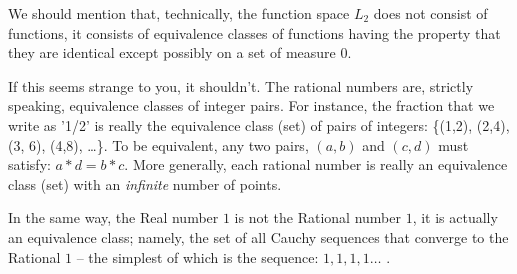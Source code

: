 \documentclass{article}
\begin{document}
We should mention that, technically, the function space $L_2$ does not 
consist of functions, it consists of 
equivalence classes of functions having the property
that they are identical except possibly on a set of measure $0$.

If this seems strange to you, it shouldn't. The rational numbers are, strictly 
speaking, equivalence classes of integer pairs.
For instance, the fraction that we write as '1/2' is really the 
equivalence class (set) of pairs of integers: 
\{(1,2), (2,4), (3, 6), (4,8), \ldots \}.
To be equivalent, any two pairs, $(a, b)$ and $(c, d)$ must satisfy: 
$a * d = b * c$. More generally, each rational number is really an equivalence class (set)
with an {\em infinite\/} number of points.

In the same way, the Real number $1$ is not the Rational number $1$, it is actually an equivalence 
class; namely, the set of all Cauchy sequences that converge to the Rational 
$1$ -- the simplest of which is the sequence: $1, 1, 1, 1\ldots$ .
\end{document}
